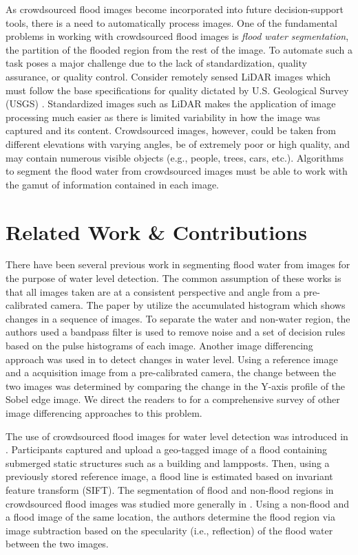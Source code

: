 \documentclass[review]{elsarticle}
\begin{document}
As crowdsourced flood images become incorporated into future decision-support tools, there is a need to automatically process images. One of the fundamental problems in working with crowdsourced flood images is  \emph{flood water segmentation}, the partition of the flooded region from the rest of the image. To automate such a task poses a major challenge due to the lack of standardization, quality assurance, or quality control. Consider remotely sensed LiDAR images which must follow the base specifications for quality dictated by U.S. Geological Survey (USGS) \cite{heidemann}. Standardized images such as LiDAR makes the application of image processing much easier as there is limited variability in how the image was captured and its content. Crowdsourced images, however, could be taken from different elevations with varying angles, be of extremely poor or high quality, and may contain numerous visible objects (e.g., people, trees, cars, etc.). Algorithms to segment the flood water from crowdsourced images must be able to work with the gamut of information contained in each image.

\section{Related Work \& Contributions}

There have been several previous work in segmenting flood water from images for the purpose of water level detection. The common assumption of these works is that all images taken are at a consistent perspective and angle from a pre-calibrated camera. The paper by \cite{park} utilize the accumulated histogram which shows changes in a sequence of images. To separate the water and non-water region, the authors used a bandpass filter is used to remove noise and a set of decision rules based on the pulse histograms of each image. Another image differencing approach was used in \cite{yu} to detect changes in water level. Using a reference image and a acquisition image from a pre-calibrated camera, the change between the two images was determined by comparing the change in the Y-axis profile of the Sobel edge image. We direct the readers to \cite{ko} for a comprehensive survey of other image differencing approaches to this problem.

The use of crowdsourced flood images for water level detection was introduced in \cite{narayanan}. Participants captured and upload a geo-tagged image of a flood containing submerged static structures such as a building and lampposts. Then, using a previously stored reference image, a flood line is estimated based on invariant feature transform (SIFT). The segmentation of flood and non-flood regions in crowdsourced flood images was studied more generally in \cite{witherow}. Using a non-flood and a flood image of the same location, the authors determine the flood region via image subtraction based on the specularity (i.e., reflection) of the flood water between the two images.
\end{document}
